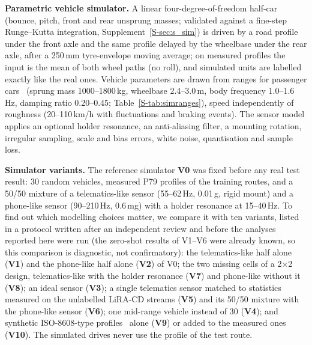 \textbf{Parametric vehicle simulator.}
A linear four-degree-of-freedom half-car (bounce, pitch, front and rear unsprung masses; validated against a fine-step Runge--Kutta integration, Supplement~\ref{S-sec:s_sim}) is driven by a road profile under the front axle and the same profile delayed by the wheelbase under the rear axle, after a 250\,mm tyre-envelope moving average; on measured profiles the input is the mean of both wheel paths (no roll), and simulated units are labelled exactly like the real ones.
Vehicle parameters are drawn from ranges for passenger cars~\cite{gillespie1992} (sprung mass 1000--1800\,kg, wheelbase 2.4--3.0\,m, body frequency 1.0--1.6\,Hz, damping ratio 0.20--0.45; Table~\ref{S-tab:simranges}), speed independently of roughness (20--110\,km/h with fluctuations and braking events).
The sensor model applies an optional holder resonance, an anti-aliasing filter, a mounting rotation, irregular sampling, scale and bias errors, white noise, quantisation and sample loss.

\textbf{Simulator variants.}
The reference simulator \textbf{V0} was fixed before any real test result: 30 random vehicles, measured P79 profiles of the training routes, and a 50/50 mixture of a telematics-like sensor (55--62\,Hz, 0.01\,g, rigid mount) and a phone-like sensor (90--210\,Hz, 0.6\,mg) with a holder resonance at 15--40\,Hz.
To find out which modelling choices matter, we compare it with ten variants, listed in a protocol written after an independent review and before the analyses reported here were run (the zero-shot results of V1--V6 were already known, so this comparison is diagnostic, not confirmatory): the telematics-like half alone (\textbf{V1}) and the phone-like half alone (\textbf{V2}) of V0; the two missing cells of a 2$\times$2 design, telematics-like with the holder resonance (\textbf{V7}) and phone-like without it (\textbf{V8}); an ideal sensor (\textbf{V3}); a single telematics sensor matched to statistics measured on the unlabelled LiRA-CD streams (\textbf{V5}) and its 50/50 mixture with the phone-like sensor (\textbf{V6}); one mid-range vehicle instead of 30 (\textbf{V4}); and synthetic ISO-8608-type profiles~\cite{iso8608} alone (\textbf{V9}) or added to the measured ones (\textbf{V10}).
The simulated drives never use the profile of the test route.
